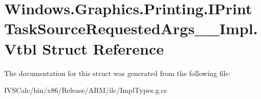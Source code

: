 \hypertarget{struct_windows_1_1_graphics_1_1_printing_1_1_i_print_task_source_requested_args_____impl_1_1_vtbl}{}\section{Windows.\+Graphics.\+Printing.\+I\+Print\+Task\+Source\+Requested\+Args\+\_\+\+\_\+\+Impl.\+Vtbl Struct Reference}
\label{struct_windows_1_1_graphics_1_1_printing_1_1_i_print_task_source_requested_args_____impl_1_1_vtbl}


The documentation for this struct was generated from the following file\+:\begin{DoxyCompactItemize}
\item 
I\+V\+S\+Calc/bin/x86/\+Release/\+A\+R\+M/ilc/Impl\+Types.\+g.\+cs\end{DoxyCompactItemize}
